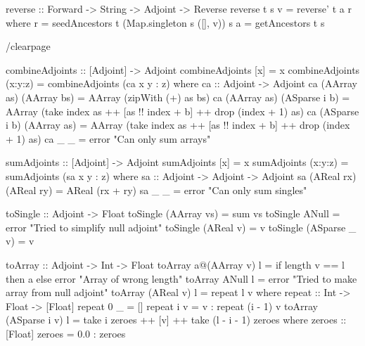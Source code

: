         \begin{haskell}[caption=Reverse pass function, label=lst:reverse, gobble=12]
            reverse :: Forward -> String -> Adjoint -> Reverse
            reverse t s v = reverse' t a r
                where
                    r = seedAncestors t (Map.singleton s ([], v)) s
                    a = getAncestors t s
        \end{haskell}

        /clearpage %
        \begin{haskell}[caption=Functions to transform and combine adjoints, label=lst:combine, gobble=12]
            combineAdjoints :: [Adjoint] -> Adjoint
            combineAdjoints [x]     = x
            combineAdjoints (x:y:z) = combineAdjoints (ca x y : z)
                where
                    ca :: Adjoint -> Adjoint
                    ca (AArray as) (AArray bs)   = AArray (zipWith (+) as bs)
                    ca (AArray as) (ASparse i b) = AArray
                        (take index as ++ [as !! index + b] ++ drop (index + 1) as)
                    ca (ASparse i b) (AArray as) = AArray
                        (take index as ++ [as !! index + b] ++ drop (index + 1) as)
                    ca _           _             = error "Can only sum arrays"
            
            sumAdjoints :: [Adjoint] -> Adjoint
            sumAdjoints [x]     = x
            sumAdjoints (x:y:z) = sumAdjoints (sa x y : z)
                where
                    sa :: Adjoint -> Adjoint -> Adjoint
                    sa (AReal rx) (AReal ry) = AReal (rx + ry)
                    sa _          _          = error "Can only sum singles"
    
            toSingle :: Adjoint -> Float
            toSingle (AArray vs)   = sum vs
            toSingle ANull         = error "Tried to simplify null adjoint"
            toSingle (AReal v)     = v
            toSingle (ASparse _ v) = v
    
            toArray :: Adjoint -> Int -> Float
            toArray a@(AArray v) l =
                if   length v == l
                then a
                else error "Array of wrong length"
            toArray ANull        l = error "Tried to make array from null adjoint"
            toArray (AReal v)    l = repeat l v
                where
                    repeat :: Int -> Float -> [Float]
                    repeat 0 _ = []
                    repeat i v = v : repeat (i - 1) v
            toArray (ASparse i v) l = take i zeroes ++ [v] ++ take (l - i - 1) zeroes
                where
                    zeroes :: [Float]
                    zeroes = 0.0 : zeroes
        \end{haskell}